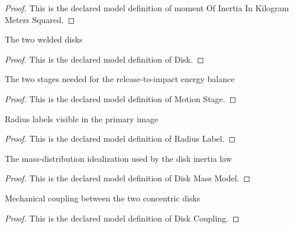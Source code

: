 \begin{proof}
  This is the declared model definition of moment Of Inertia In Kilogram Meters Squared.
\end{proof}
\begin{definition}[Disk]
  \label{def:physics:phyx-mini-0775:phyxminiproblems-problemphyxmini0775-disk}
  The two welded disks
\end{definition}
\begin{proof}
  This is the declared model definition of Disk.
\end{proof}
\begin{definition}
  \label{def:physics:phyx-mini-0775:phyxminiproblems-problemphyxmini0775-motionstage}
  The two stages needed for the release-to-impact energy balance
\end{definition}
\begin{proof}
  This is the declared model definition of Motion Stage.
\end{proof}
\begin{definition}
  \label{def:physics:phyx-mini-0775:phyxminiproblems-problemphyxmini0775-radiuslabel}
  Radius labels visible in the primary image
\end{definition}
\begin{proof}
  This is the declared model definition of Radius Label.
\end{proof}
\begin{definition}
  \label{def:physics:phyx-mini-0775:phyxminiproblems-problemphyxmini0775-diskmassmodel}
  The mass-distribution idealization used by the disk inertia law
\end{definition}
\begin{proof}
  This is the declared model definition of Disk Mass Model.
\end{proof}
\begin{definition}
  \label{def:physics:phyx-mini-0775:phyxminiproblems-problemphyxmini0775-diskcoupling}
  Mechanical coupling between the two concentric disks
\end{definition}
\begin{proof}
  This is the declared model definition of Disk Coupling.
\end{proof}

